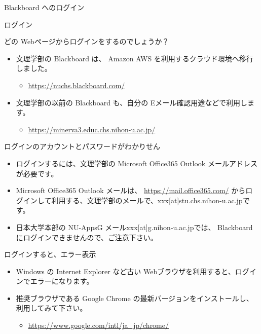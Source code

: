 \documentclass[a4j,10pt]{jsarticle}
\def\lthtmlcheckvsize{\ifdim\ht\sizebox<\vsize 
  \ifdim\wd\sizebox<\hsize\expandafter\hfill\fi \expandafter\vfill
  \else\expandafter\vss\fi}%
\begin{document}
{\newpage\clearpage
{}%
\begin{frame}[label={sec:orgbc11a07},fragile]{Blackboard へのログイン}
\begin{block}{ログイン}
\begin{block}{どの Webページからログインをするのでしょうか？}
\begin{itemize}
\item 文理学部の Blackboard は、 Amazon AWS を利用するクラウド環境へ移行しました。
\begin{itemize}
\item \url{https://nuchs.blackboard.com/}
\end{itemize}
\par
\item 文理学部の以前の Blackboard も、自分の Eメール確認用途などで利用します。
\begin{itemize}
\item \url{https://minerva3.educ.chs.nihon-u.ac.jp/}
\end{itemize}
\end{itemize}
\end{block}
\par
\begin{block}{ログインのアカウントとパスワードがわかりせん}
\begin{itemize}
\item ログインするには、文理学部の Microsoft Office365 Outlook メールアドレスが必要です。
\item Microsoft Office365 Outlook メールは、 \url{https://mail.office365.com/} からログインして利用する、文理学部のメールで、xxx[at]stu.chs.nihon-u.ac.jpです。
\item 日本大学本部の NU-AppsG メールxxx[at]g.nihon-u.ac.jpでは、 Blackboard にログインできませんので、ご注意下さい。
\end{itemize}
\end{block}
\par
\begin{block}{ログインすると、エラー表示}
\begin{itemize}
\item Windows の Internet Explorer など古い Webブラウザを利用すると、ログインでエラーになります。
\item 推奨ブラウザである Google Chrome の最新バージョンをインストールし、利用してみて下さい。
\begin{itemize}
\item \url{https://www.google.com/intl/ja\_jp/chrome/}
\end{itemize}
\end{itemize}
\end{block}
\end{block}
\end{frame}%
\lthtmlfigureZ
\lthtmlcheckvsize\clearpage}
\end{document}

